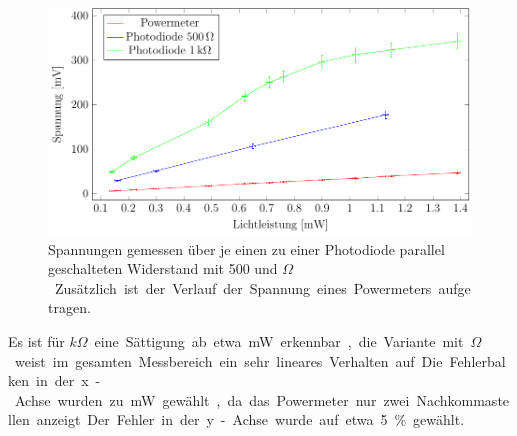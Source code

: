 \begin{figure} [ht]
	\centering
	\includegraphics[width=1\linewidth]{graphs/fotodiode/diode.pdf}
	\caption[Vermessung einer Photodiode]{
		Spannungen gemessen über je einen zu einer Photodiode parallel geschalteten Widerstand mit 500 und \unit[1000]{$\Omega$}. Zusätzlich ist der Verlauf der Spannung eines Powermeters aufgetragen.
	}
	\label{fig:photodiode}
\end{figure}

Es ist für \unit[1]{$k\Omega$} eine Sättigung ab etwa \unit[0,9]{mW} erkennbar, die Variante mit \unit[500]{$\Omega$} weist im gesamten Messbereich ein sehr lineares Verhalten auf. Die Fehlerbalken in der x-Achse wurden zu \unit[0,01]{mW} gewählt, da das Powermeter nur zwei Nachkommastellen anzeigt. Der Fehler in der y-Achse wurde auf etwa 5\% gewählt.

